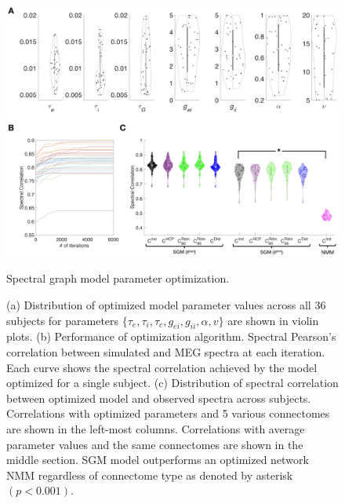 \begin{figure}[htbp]
    \centering
    \includegraphics[width=\textwidth]{../figures/chapter5/fig4_violin.png}
    \caption{Spectral graph model parameter optimization.}
    \caption*{(a) Distribution of optimized model parameter values across all 36 subjects for parameters $\{\tau_e, \tau_i, \tau_c, g_{ei}, g_{ii}, \alpha, v\}$ are shown in violin plots. (b) Performance of optimization algorithm. Spectral Pearson's correlation between simulated and MEG spectra at each iteration. Each curve shows the spectral correlation achieved by the model optimized for a single subject. (c) Distribution of spectral correlation between optimized model and observed spectra across subjects. Correlations with optimized parameters and 5 various connectomes are shown in the left-most columns. Correlations with average parameter values and the same connectomes are shown in the middle section. SGM model outperforms an optimized network NMM regardless of connectome type as denoted by asterisk $(p < 0.001)$.}
    \label{fig:violin}
\end{figure}

